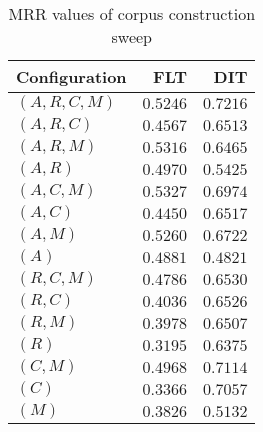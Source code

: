 
\begin{table}
\begin{spacing}{1.2}
\centering
\caption{MRR values of \bookkeeper corpus construction sweep}
\label{table:bookkeeper_corpus_sweep}
\vspace{0.2em}
\begin{tabular}{lrr}
\toprule
Configuration &           FLT &           DIT \\
\midrule
  $(A,R,C,M)$ &      $0.5246$ & $\bm{0.7216}$ \\
    $(A,R,C)$ &      $0.4567$ &      $0.6513$ \\
    $(A,R,M)$ &      $0.5316$ &      $0.6465$ \\
      $(A,R)$ &      $0.4970$ &      $0.5425$ \\
    $(A,C,M)$ & $\bm{0.5327}$ &      $0.6974$ \\
      $(A,C)$ &      $0.4450$ &      $0.6517$ \\
      $(A,M)$ &      $0.5260$ &      $0.6722$ \\
        $(A)$ &      $0.4881$ &      $0.4821$ \\
    $(R,C,M)$ &      $0.4786$ &      $0.6530$ \\
      $(R,C)$ &      $0.4036$ &      $0.6526$ \\
      $(R,M)$ &      $0.3978$ &      $0.6507$ \\
        $(R)$ &      $0.3195$ &      $0.6375$ \\
      $(C,M)$ &      $0.4968$ &      $0.7114$ \\
        $(C)$ &      $0.3366$ &      $0.7057$ \\
        $(M)$ &      $0.3826$ &      $0.5132$ \\
\bottomrule
\end{tabular}

\end{spacing}
\end{table}

